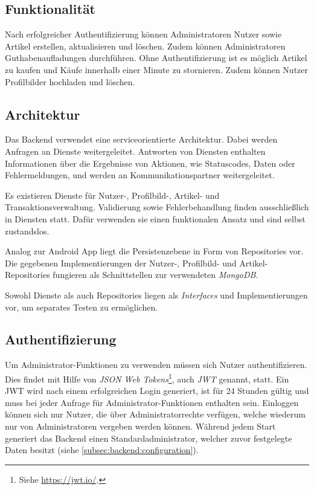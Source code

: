 \documentclass[a4paper, 11pt]{article}
\begin{document}
\subsection{Funktionalität}
\label{subsec:backend:functionality}
Nach erfolgreicher Authentifizierung können Administratoren Nutzer sowie Artikel erstellen, aktualisieren und löschen.
Zudem können Administratoren Guthabenaufladungen durchführen.
Ohne Authentifizierung ist es möglich Artikel zu kaufen und Käufe innerhalb einer Minute zu stornieren.
Zudem können Nutzer Profilbilder hochladen und löschen.

\subsection{Architektur}
\label{subsec:backend:architecture}
Das Backend verwendet eine serviceorientierte Architektur.
Dabei werden Anfragen an Dienste weitergeleitet.
Antworten von Diensten enthalten Informationen über die Ergebnisse von Aktionen, wie Statuscodes, Daten oder Fehlermeldungen, und werden an Kommunikationspartner weitergeleitet.

Es existieren Dienste für Nutzer-, Profilbild-, Artikel- und Transaktionsverwaltung.
Validierung sowie Fehlerbehandlung finden ausschließlich in Diensten statt.
Dafür verwenden sie einen funktionalen Ansatz und sind selbst zustandslos.

Analog zur Android App liegt die Persistenzebene in Form von Repositories vor.
Die gegebenen Implementierungen der Nutzer-, Profilbild- und Artikel-Repositories fungieren als Schnittstellen zur verwendeten \textit{MongoDB}.

Sowohl Dienste als auch Repositories liegen als \textit{Interfaces} und Implementierungen vor, um separates Testen zu ermöglichen.

\subsection{Authentifizierung}
\label{subsec:backend:authentication}
Um Administrator-Funktionen zu verwenden müssen sich Nutzer authentifizieren.
Dies findet mit Hilfe von \textit{JSON Web Tokens}\footnote{Siehe \url{https://jwt.io/}.}, auch \textit{JWT} genannt, statt.
Ein JWT wird nach einem erfolgreichen Login generiert, ist für 24 Stunden gültig und muss bei jeder Anfrage für Administrator-Funktionen enthalten sein.
Einloggen können sich nur Nutzer, die über Administratorrechte verfügen, welche wiederum nur von Administratoren vergeben werden können.
Während jedem Start generiert das Backend einen Standard\-administrator, welcher zuvor festgelegte Daten besitzt (siehe \autoref{subsec:backend:configuration}).
\end{document}
